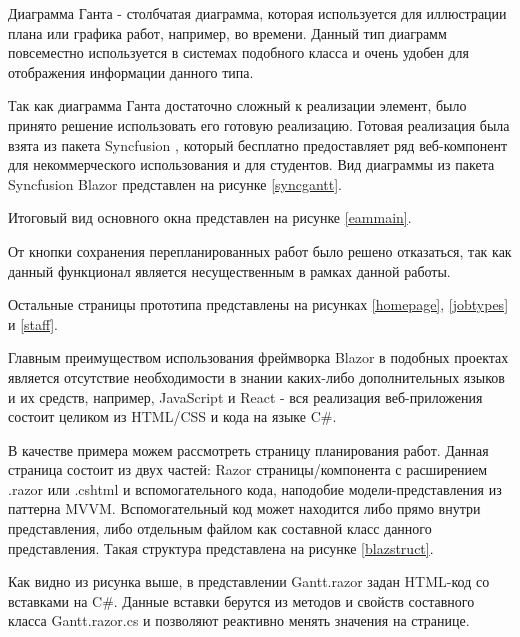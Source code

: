 Диаграмма Ганта - столбчатая диаграмма, которая используется для иллюстрации плана или графика работ, например, во времени. Данный тип диаграмм повсеместно используется в системах подобного класса и очень удобен для отображения информации данного типа.

Так как диаграмма Ганта достаточно сложный к реализации элемент, было принято решение использовать его готовую реализацию. Готовая реализация была взята из пакета Syncfusion \cite{syncblazor}, который бесплатно предоставляет ряд веб-компонент для некоммерческого использования и для студентов. Вид диаграммы из пакета Syncfusion Blazor представлен на рисунке \ref{syncgantt}.


Итоговый вид основного окна представлен на рисунке \ref{eammain}.


От кнопки сохранения перепланированных работ было решено отказаться, так как данный функционал является несущественным в рамках данной работы.

Остальные страницы прототипа представлены на рисунках \ref{homepage}, \ref{jobtypes} и \ref{staff}.




Главным преимуществом использования фреймворка Blazor в подобных проектах является отсутствие необходимости в знании каких-либо дополнительных языков и их средств, например, JavaScript и React - вся реализация веб-приложения состоит целиком из HTML/CSS и кода на языке C\#.

В качестве примера можем рассмотреть страницу планирования работ. Данная страница состоит из двух частей: Razor страницы/компонента с расширением .razor или .cshtml и вспомогательного кода, наподобие модели-представления из паттерна MVVM. Вспомогательный код может находится либо прямо внутри представления, либо отдельным файлом как составной класс данного представления. Такая структура представлена на рисунке \ref{blazstruct}.


Как видно из рисунка выше, в представлении Gantt.razor задан HTML-код со вставками на C\#. Данные вставки берутся из методов и свойств составного класса Gantt.razor.cs и позволяют реактивно менять значения на странице.

